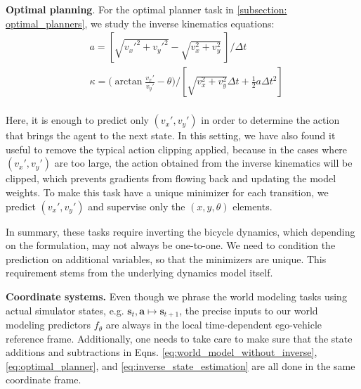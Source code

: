 \begin{appendices}
\textbf{Optimal planning}. For the optimal planner task in \ref{subsection: optimal_planners}, we study the inverse kinematics equations:
\begin{equation}
    \begin{aligned}
    & a = \left[\sqrt{v_x'^2 + v_y'^2} - \sqrt{v_x^2 + v_y^2} \ \right]/\Delta t \\
    & \kappa = \big(\arctan \frac{v_x'}{v_y'} - \theta \big) / \left [ \sqrt{v_x^2 + v_y^2}\Delta t + \frac{1}{2}a \Delta t^2 \right ] \\
    \end{aligned}
\end{equation}

Here, it is enough to predict only $(v_x', v_y')$ in order to determine the action that brings the agent to the next state. In this setting, we have also found it useful to remove the typical action clipping applied, because in the cases where $(v_x', v_y')$ are too large, the action obtained from the inverse kinematics will be clipped, which prevents gradients from flowing back and updating the model weights. To make this task have a unique minimizer for each transition, we predict $(v_x', v_y')$ and supervise only the $(x, y, \theta)$ elements.

In summary, these tasks require inverting the bicycle dynamics, which depending on the formulation, may not always be one-to-one. We need to condition the prediction on additional variables, so that the minimizers are unique. This requirement stems from the underlying dynamics model itself.

\textbf{Coordinate systems.} Even though we phrase the world modeling tasks using actual simulator states, e.g. $\mathbf{s}_t, \mathbf{a} \mapsto \mathbf{s}_{t+1}$, the precise inputs to our world modeling predictors $f_\theta$ are always in the local time-dependent ego-vehicle reference frame. Additionally, one needs to take care to make sure that the state additions and subtractions in Eqns. \ref{eq:world_model_without_inverse}, \ref{eq:optimal_planner}, and \ref{eq:inverse_state_estimation} are all done in the same coordinate frame.

\end{appendices}
